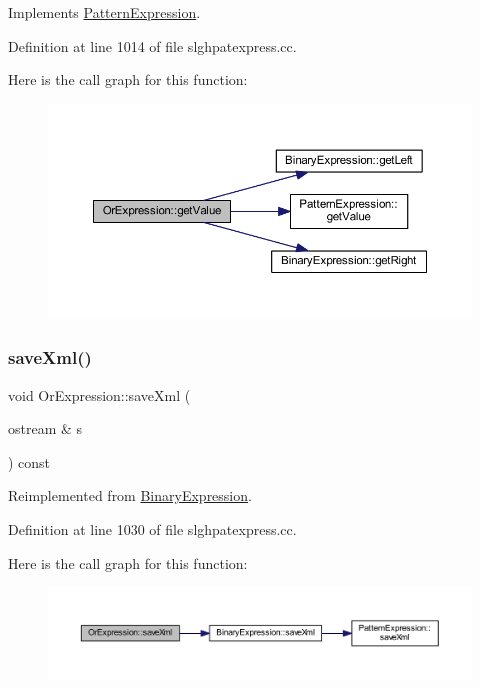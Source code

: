 Implements \mbox{\hyperlink{class_pattern_expression_a8332c6ea4c5a7e9dfc690df2a6458bb8}{Pattern\+Expression}}.



Definition at line 1014 of file slghpatexpress.\+cc.

Here is the call graph for this function\+:
\nopagebreak
\begin{figure}[H]
\begin{center}
\leavevmode
\includegraphics[width=350pt]{class_or_expression_a48042c08d38b45e3f32e28953a25584b_cgraph}
\end{center}
\end{figure}
\mbox{\label{class_or_expression_aab8268d75147e85ea9110a07e0add377}} 
\subsubsection{\texorpdfstring{saveXml()}{saveXml()}}
{\footnotesize\ttfamily void Or\+Expression\+::save\+Xml (\begin{DoxyParamCaption}\item[{ostream \&}]{s }\end{DoxyParamCaption}) const\hspace{0.3cm}{\ttfamily [virtual]}}



Reimplemented from \mbox{\hyperlink{class_binary_expression_a4b9e768a619b713d6c1ff35a618d98ec}{Binary\+Expression}}.



Definition at line 1030 of file slghpatexpress.\+cc.

Here is the call graph for this function\+:
\nopagebreak
\begin{figure}[H]
\begin{center}
\leavevmode
\includegraphics[width=350pt]{class_or_expression_aab8268d75147e85ea9110a07e0add377_cgraph}
\end{center}
\end{figure}


